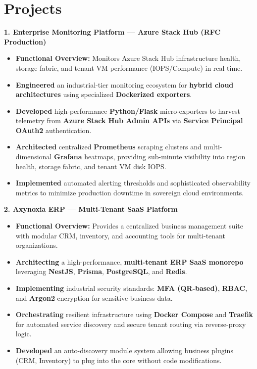 \documentclass[10pt, letterpaper]{article}
\newenvironment{highlights}{
\begin{itemize}[leftmargin=12pt, itemsep=2pt]
}{
\end{itemize}
}
\begin{document}
\section{Projects}

\textbf{1. Enterprise Monitoring Platform --- Azure Stack Hub (RFC Production)}
\begin{highlights}
\item \textbf{Functional Overview:} Monitors Azure Stack Hub infrastructure health, storage fabric, and tenant VM performance (IOPS/Compute) in real-time.
\item \textbf{Engineered} an industrial-tier monitoring ecosystem for \textbf{hybrid cloud architectures} using specialized \textbf{Dockerized exporters}.
\item \textbf{Developed} high-performance \textbf{Python/Flask} micro-exporters to harvest telemetry from \textbf{Azure Stack Hub Admin APIs} via \textbf{Service Principal OAuth2} authentication.
\item \textbf{Architected} centralized \textbf{Prometheus} scraping clusters and multi-dimensional \textbf{Grafana} heatmaps, providing sub-minute visibility into region health, storage fabric, and tenant VM disk IOPS.
\item \textbf{Implemented} automated alerting thresholds and sophisticated observability metrics to minimize production downtime in sovereign cloud environments.
\end{highlights}

\textbf{2. Axynoxia ERP --- Multi-Tenant SaaS Platform}
\begin{highlights}
\item \textbf{Functional Overview:} Provides a centralized business management suite with modular CRM, inventory, and accounting tools for multi-tenant organizations.
\item \textbf{Architecting} a high-performance, \textbf{multi-tenant ERP SaaS monorepo} leveraging \textbf{NestJS}, \textbf{Prisma}, \textbf{PostgreSQL}, and \textbf{Redis}.
\item \textbf{Implementing} industrial security standards: \textbf{MFA (QR-based)}, \textbf{RBAC}, and \textbf{Argon2} encryption for sensitive business data.
\item \textbf{Orchestrating} resilient infrastructure using \textbf{Docker Compose} and \textbf{Traefik} for automated service discovery and secure tenant routing via reverse-proxy logic.
\item \textbf{Developed} an auto-discovery module system allowing business plugins (CRM, Inventory) to plug into the core without code modifications.
\end{highlights}
\end{document}
